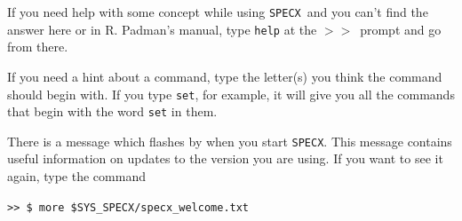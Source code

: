 \documentclass[11pt,twoside]{article}
\newcommand{\SPECX}{{\tt SPECX}}
\newcommand{\SP}{{$>\!>$}}
\begin{document}
If you need help with some concept while using \SPECX\ and you can't
find the answer here or in R. Padman's manual, type {\tt help} at the
\SP\ prompt and go from there.

If you need a hint about a command, type the letter(s) you think the
command should begin with.  If you type {\tt set}, for example, it
will give you all the commands that begin with the word {\tt set} in
them.

There is a message which flashes by when you start \SPECX . This message
contains useful information on updates to the version you are using.
If you want to see it again, type the command

\verb|>> $ more $SYS_SPECX/specx_welcome.txt|

\typeout{  }
\typeout{*****************************************************}
\typeout{  }
\typeout{  }
\typeout{*****************************************************}
\typeout{  }
\end{document}
